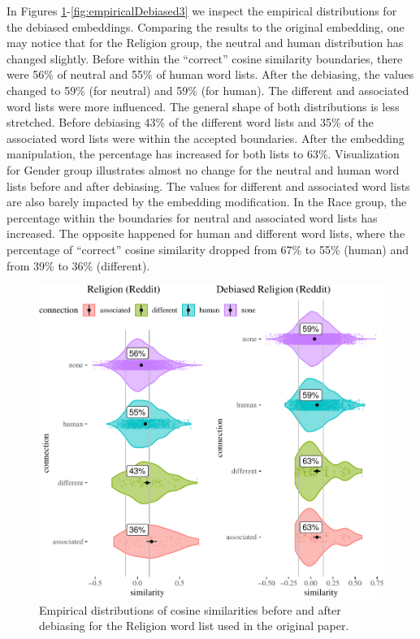 \documentclass{clv3}
\begin{document}
In Figures \ref{fig:empiricalDebiased1}-\ref{fig:empiricalDebiased3} we
inspect the empirical distributions for the debiased embeddings.
Comparing the results to the original embedding, one may notice that for
the Religion group, the neutral and human distribution has changed
slightly. Before within the ``correct'' cosine similarity boundaries,
there were 56\% of neutral and 55\% of human word lists. After the
debiasing, the values changed to 59\% (for neutral) and 59\% (for human).
The different and associated word lists were more influenced. The
general shape of both distributions is less stretched. Before debiasing
43\% of the different word lists and 35\% of the associated word lists
were within the accepted boundaries. After the embedding manipulation,
the percentage has increased for both lists to 63\%. Visualization for
Gender group illustrates almost no change for the neutral and human word
lists before and after debiasing. The values for different and
associated word lists are also barely impacted by the embedding
modification. In the Race group, the percentage within the boundaries
for neutral and associated word lists has increased. The opposite
happened for human and different word lists, where the percentage of
``correct'' cosine similarity dropped from 67\% to 55\% (human) and from
39\% to 36\% (different).

\begin{figure}

\begin{center}\includegraphics[width=0.95\linewidth]{figures/figdebiasedCosine21c} \end{center}
\caption{Empirical distributions of cosine similarities before and after  debiasing  for  the Religion word list  used in  the original paper.}
\label{fig:empiricalDebiased1}
\end{figure}
\end{document}
